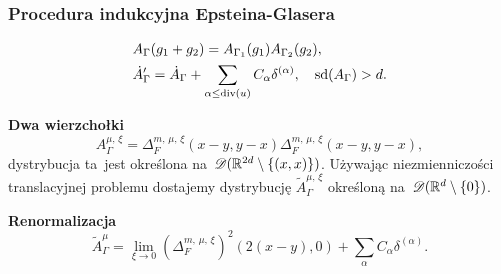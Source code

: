 \documentclass[10pt,t]{beamer}
\begin{document}
\begin{frame}
  \frametitle{Procedura indukcyjna Epsteina-Glasera}


  \begin{subequations}
    \begin{align}
      \label{eq:Epstein-Glaser-24-A}
      &A_{ \Gamma }( g _{ 1 } + g_{ 2 } ) =
        A_{ \Gamma_{ 1 } }( g _{ 1 } ) A_{ \Gamma_{ 2 } }( g_{ 2 } ), \\
      \label{eq:Epstein-Glaser-24-B}
      &\dot{ A }_{ \Gamma }' =
        \dot{ A }_{ \Gamma }
        + \sum\limits_{ \alpha \leq \textrm{div}( u ) } C_{ \alpha } \delta^{ ( \alpha ) }, \quad
        \textrm{sd}( A_{ \Gamma } ) > d.
    \end{align}
  \end{subequations}

  \textbf{Dwa wierzchołki}
  \begin{equation}
    \label{eq:Epstein-Glaser-25}
    A_{ \Gamma }^{ \mu,\, \xi } =
    \Delta_{ F }^{ m,\, \mu,\, \xi }( x - y, y - x ) \Delta_{ F }^{ m,\, \mu,\, \xi }( x - y, y - x ),
  \end{equation}
  dystrybucja ta~jest określona
  na~$\mathcal{D}( \mathbb{R}^{ 2 d } \setminus \{ ( x, x ) \} )$. Używając
  niezmienniczości translacyjnej problemu dostajemy dystrybucję
  $\widetilde{ A }_{ \Gamma }^{ \mu,\, \xi }$ określoną
  na~$\mathcal{D}( \mathbb{R}^{ d } \setminus \{ 0 \} )$.

  \textbf{Renormalizacja}
  \begin{equation}
    \label{eq:Epstein-Glaser-26}
    \widetilde{ A }_{ \Gamma }^{ \mu } =
    \lim\limits_{ \xi \to 0 } ( \Delta_{ F }^{ m,\, \mu,\, \xi } )^{ 2 } ( 2 ( x - y ), 0 )
    + \sum_{ \alpha } C_{ \alpha } \delta^{ ( \alpha ) }.
  \end{equation}

\end{frame}
\end{document}
